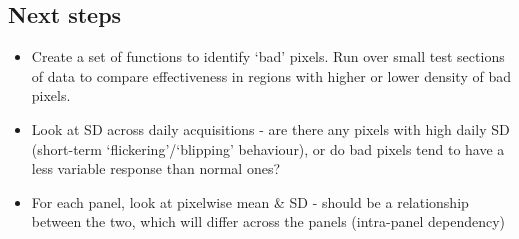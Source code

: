 \documentclass[10pt,fleqn]{article}
\begin{document}
\subsection*{Next steps}

\begin{itemize}

\item
Create a set of functions to identify `bad' pixels. Run over small test sections of data to compare effectiveness in regions with higher or lower density of bad pixels. %

\item
Look at SD across daily acquisitions - are there any pixels with high daily SD (short-term `flickering'/`blipping' behaviour), or do bad pixels tend to have a less variable response than normal ones? 



\item
For each panel, look at pixelwise mean \& SD - should be a relationship between the two, which will differ across the panels (intra-panel dependency)


\end{itemize}

\end{document}
